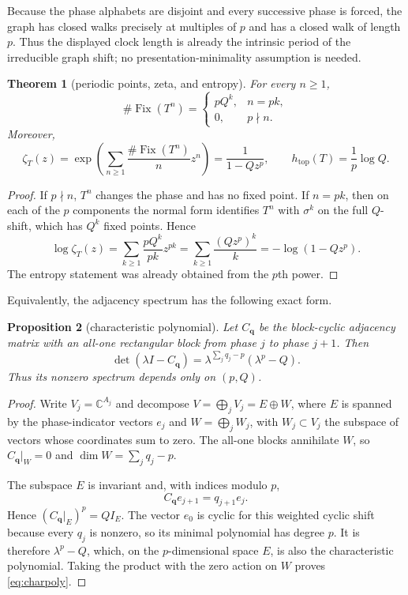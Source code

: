 \documentclass[11pt,a4paper]{amsart}
\newtheorem{theorem}{Theorem}[section]
\newtheorem{proposition}[theorem]{Proposition}
\theoremstyle{definition}
\theoremstyle{remark}
\newcommand{\Fix}{\operatorname{Fix}}
\begin{document}
Because the phase alphabets are disjoint and every successive phase is
forced, the graph has closed walks precisely at multiples of $p$ and has a
closed walk of length $p$.  Thus the displayed clock length is already the
intrinsic period of the irreducible graph shift; no presentation-minimality
assumption is needed.

\begin{theorem}[periodic points, zeta, and entropy]\label{thm:invariants}
For every $n\geq1$,
\[
 \#\Fix(T^n)=
 \begin{cases}
 pQ^k,&n=pk,\\
 0,&p\nmid n.
 \end{cases}
\]
Moreover,
\[
 \zeta_T(z)
 =\exp\left(\sum_{n\geq1}\frac{\#\Fix(T^n)}n z^n\right)
 =\frac1{1-Qz^p},
 \qquad
 h_{\mathrm{top}}(T)=\frac1p\log Q.
\]
\end{theorem}

\begin{proof}
If $p\nmid n$, $T^n$ changes the phase and has no fixed point.  If $n=pk$,
then on each of the $p$ components the normal form identifies $T^n$ with
$\sigma^k$ on the full $Q$-shift, which has $Q^k$ fixed points.  Hence
\[
 \log\zeta_T(z)
 =\sum_{k\geq1}\frac{pQ^k}{pk}z^{pk}
 =\sum_{k\geq1}\frac{(Qz^p)^k}{k}
 =-\log(1-Qz^p).
\]
The entropy statement was already obtained from the $p$th power.
\end{proof}

Equivalently, the adjacency spectrum has the following exact form.

\begin{proposition}[characteristic polynomial]\label{prop:charpoly}
Let $C_{\mathbf q}$ be the block-cyclic adjacency matrix with an all-one
rectangular block from phase $j$ to phase $j+1$.  Then
\begin{equation}\label{eq:charpoly}
 \det(\lambda I-C_{\mathbf q})
 =\lambda^{\sum_jq_j-p}(\lambda^p-Q).
\end{equation}
Thus its nonzero spectrum depends only on $(p,Q)$.
\end{proposition}

\begin{proof}
Write $V_j=\mathbb C^{A_j}$ and decompose
$V=\bigoplus_jV_j=E\oplus W$, where $E$ is spanned by the phase-indicator
vectors $e_j$ and $W=\bigoplus_jW_j$, with $W_j\subset V_j$ the subspace
of vectors whose coordinates sum to zero.  The all-one blocks annihilate
$W$, so $C_{\mathbf q}|_W=0$ and
$\dim W=\sum_jq_j-p$.

The subspace $E$ is invariant and, with indices modulo $p$,
\[
 C_{\mathbf q}e_{j+1}=q_{j+1}e_j.
\]
Hence $(C_{\mathbf q}|_E)^p=QI_E$.  The vector $e_0$ is cyclic for this
weighted cyclic shift because every $q_j$ is nonzero, so its minimal
polynomial has degree $p$.  It is therefore $\lambda^p-Q$, which, on the
$p$-dimensional space $E$, is also the characteristic polynomial.  Taking
the product with the zero action on $W$ proves \eqref{eq:charpoly}.
\end{proof}
\end{document}
